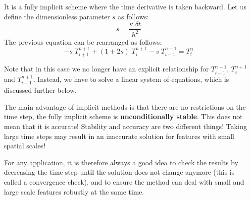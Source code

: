 It is a fully implicit scheme where the time derivative is taken backward.
Let us define the dimensionless parameter $s$ as follows:
\begin{equation}
s=\frac{\kappa \; \delta t}{h^2}
\end{equation}
The previous equation can be rearranged as follows:
\begin{equation}
\boxed{
-s \; T_{i+1}^{n+1} + (1+2s)\; T_{i}^{n+1} - s\; T_{i-1}^{n+1} = T_i^{n}
}
\end{equation}

\begin{center}

\end{center}



Note that in this case we no longer have an explicit relationship for 
$T^{n+1}_{i-1}$, $T^{n+1}_i$ and $T^{n+1}_{i+1}$.
Instead, we have to solve a {\color{olive}linear system of equations}, which is discussed further below.

The main advantage of implicit methods is that there are no restrictions on the time step,
the fully implicit scheme is {\bf unconditionally stable}.
This does not mean that it is accurate! Stability and accuracy are two different things! 
Taking large time steps may result in an inaccurate solution for features with
small spatial scales!

For any application, it is therefore always a good idea to check the 
results by decreasing the time step
until the solution does not change anymore (this is called a {\color{olive}convergence check}), and 
to ensure the
method can deal with small and large scale features robustly at the same time.


